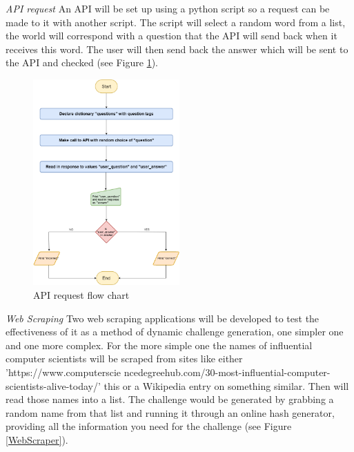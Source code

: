 \documentclass[12pt,a4paper]{article}
\begin{document}
\emph{API request} 
An API will be set up using a python script so a request can be made to it with another script. The script will select a random word from a list, the world will correspond with a question that the API will send back when it receives this word. The user will then send back the answer which will be sent to the API and checked (see Figure \ref{APIRequest}).   

\begin{figure}[h]
    \centering
    \includegraphics[width=0.5\textwidth]{Figs/API_request.png} 
    \caption{API request flow chart} 
    \label{APIRequest}
\end{figure}   


\emph{Web Scraping} 
Two web scraping applications will be developed to test the effectiveness of it as a method of dynamic challenge generation, one simpler one and one more complex. For the more simple one the names of influential computer scientists will be scraped from sites like either 'https://www.computerscie
ncedegreehub.com/30-most-influential-computer-scientists-alive-today/' this or a Wikipedia entry on something similar. Then will read those names into a list. The challenge would be generated by grabbing a random name from that list and running it through an online hash generator, providing all the information you need for the challenge (see Figure \ref{WebScraper}).   
\end{document}
